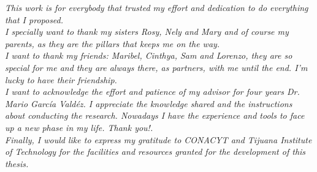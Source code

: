 
\textit{This work is for everybody that trusted my effort and
dedication to do everything that I proposed.\\  I specially want to thank
my sisters Rosy, Nely and Mary and of course my parents,
as they are the pillars that keeps me on the way.\\  I want to thank my
friends: Maribel, Cinthya, Sam and Lorenzo, they are so special for me
and they are always there, as partners, with me until the end.
I’m lucky to have their friendship.\\  I want to acknowledge the effort and
patience of my advisor  for four years Dr. Mario Garc\'ia Vald\'ez. I appreciate the
knowledge shared and the instructions about conducting the research. Nowadays I
have the experience and tools to face up a new phase in my life. Thank you!.\\  
Finally, I would like to express my gratitude to CONACYT and
Tijuana Institute of Technology for the facilities and resources
granted for the development of this thesis.}
